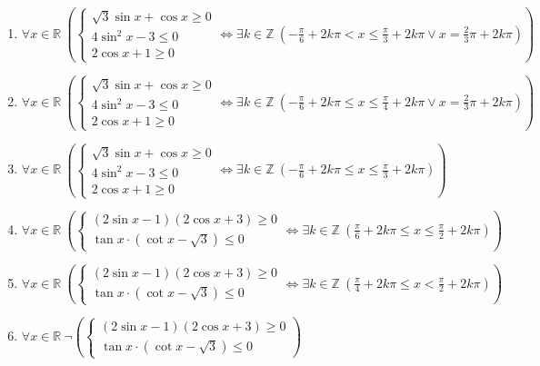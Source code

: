 \documentclass[11pt,a4paper]{article}
\begin{document}
\begin{enumerate}
\item $\displaystyle \forall x \in \mathbb{R}\ \left( \begin{cases} \sqrt{3}\sin x + \cos x \ge 0 \\ 4\sin^{2} x - 3 \le 0 \\ 2\cos x + 1 \ge 0 \end{cases} \iff \exists k \in \mathbb{Z}\ \left( -\frac{\pi}{6} + 2k\pi < x \le \frac{\pi}{3} + 2k\pi \lor x = \frac{2}{3}\pi + 2k\pi \right) \right)$
\item $\displaystyle \forall x \in \mathbb{R}\ \left( \begin{cases} \sqrt{3}\sin x + \cos x \ge 0 \\ 4\sin^{2} x - 3 \le 0 \\ 2\cos x + 1 \ge 0 \end{cases} \iff \exists k \in \mathbb{Z}\ \left( -\frac{\pi}{6} + 2k\pi \le x \le \frac{\pi}{4} + 2k\pi \lor x = \frac{2}{3}\pi + 2k\pi \right) \right)$
\item $\displaystyle \forall x \in \mathbb{R}\ \left( \begin{cases} \sqrt{3}\sin x + \cos x \ge 0 \\ 4\sin^{2} x - 3 \le 0 \\ 2\cos x + 1 \ge 0 \end{cases} \iff \exists k \in \mathbb{Z}\ \left( -\frac{\pi}{6} + 2k\pi \le x \le \frac{\pi}{3} + 2k\pi \right) \right)$
\item $\displaystyle \forall x \in \mathbb{R}\ \left( \begin{cases} (2\sin x - 1)(2\cos x + 3) \ge 0 \\ \tan x \cdot (\cot x - \sqrt{3}) \le 0 \end{cases} \iff \exists k \in \mathbb{Z}\ \left( \frac{\pi}{6} + 2k\pi \le x \le \frac{\pi}{2} + 2k\pi \right) \right)$
\item $\displaystyle \forall x \in \mathbb{R}\ \left( \begin{cases} (2\sin x - 1)(2\cos x + 3) \ge 0 \\ \tan x \cdot (\cot x - \sqrt{3}) \le 0 \end{cases} \iff \exists k \in \mathbb{Z}\ \left( \frac{\pi}{4} + 2k\pi \le x < \frac{\pi}{2} + 2k\pi \right) \right)$
\item $\displaystyle \forall x \in \mathbb{R}\ \lnot \left( \begin{cases} (2\sin x - 1)(2\cos x + 3) \ge 0 \\ \tan x \cdot (\cot x - \sqrt{3}) \le 0 \end{cases} \right)$

\end{enumerate}
\end{document}
